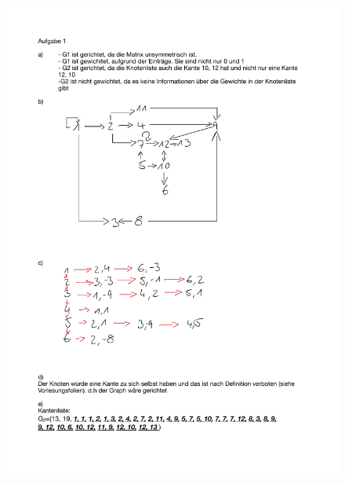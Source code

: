 \documentclass[12pt]{scrartcl}
\begin{document}

\exercise{}
\begin{figure}[h!]
\begin{center}
\includegraphics[scale=0.72]{Aufgabe1.pdf}
\end{center}
\end{figure}
\newpage
\exercise{}
\end{document}
